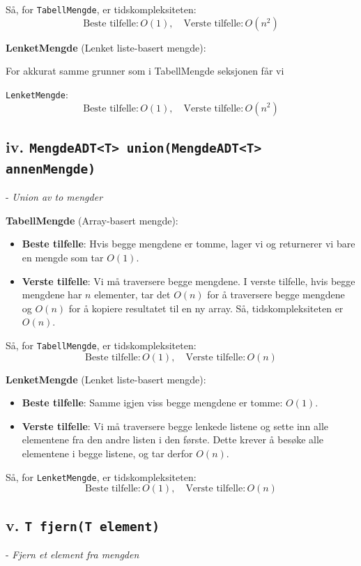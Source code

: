 \documentclass[12pt]{article}
\begin{document}
Så, for \texttt{TabellMengde}, er tidskompleksiteten:
\[
\text{Beste tilfelle}: O(1), \quad \text{Verste tilfelle}: O(n^2)
\]

\noindent 
\textbf{LenketMengde} (Lenket liste-basert mengde):

\noindent 
For akkurat samme grunner som i TabellMengde seksjonen får vi

\noindent 
\texttt{LenketMengde}:
\[
\text{Beste tilfelle}: O(1), \quad \text{Verste tilfelle}: O(n^2)
\]

\subsection*{iv. \texttt{MengdeADT<T> union(MengdeADT<T> annenMengde)}} - \textit{Union av to mengder}

\textbf{TabellMengde} (Array-basert mengde):
\begin{itemize}
    \item \textbf{Beste tilfelle}: Hvis begge mengdene er tomme, 
        lager vi og returnerer vi bare en mengde som tar \(O(1)\).
    \item \textbf{Verste tilfelle}: Vi må traversere begge mengdene. 
        I verste tilfelle, hvis begge mengdene har \(n\) elementer, 
        tar det \(O(n)\) for å traversere begge mengdene og \(O(n)\) 
        for å kopiere resultatet til en ny array. Så, tidskompleksiteten er \(O(n)\). 
\end{itemize}

Så, for \texttt{TabellMengde}, er tidskompleksiteten:
\[
\text{Beste tilfelle}: O(1), \quad \text{Verste tilfelle}: O(n)
\]

\textbf{LenketMengde} (Lenket liste-basert mengde):
\begin{itemize}
    \item \textbf{Beste tilfelle}: Samme igjen viss begge mengdene er tomme: \(O(1)\).
    \item \textbf{Verste tilfelle}: Vi må traversere begge lenkede listene og sette inn alle elementene fra den andre listen i den første. Dette krever å besøke alle elementene i begge listene, og tar derfor \(O(n)\).
\end{itemize}

Så, for \texttt{LenketMengde}, er tidskompleksiteten:
\[
\text{Beste tilfelle}: O(1), \quad \text{Verste tilfelle}: O(n)
\]

\subsection*{v. \texttt{T fjern(T element)}} - \textit{Fjern et element fra mengden}
\end{document}
